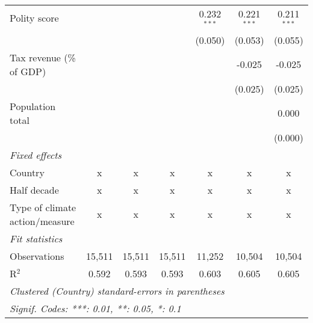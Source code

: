 \begin{tabular}{lcccccc}
   Polity score                                                         &         &                &                & 0.232$^{***}$  & 0.221$^{***}$  & 0.211$^{***}$\\   
                                                                        &         &                &                & (0.050)        & (0.053)        & (0.055)\\   
   Tax revenue (\% of GDP)                                              &         &                &                &                & -0.025         & -0.025\\   
                                                                        &         &                &                &                & (0.025)        & (0.025)\\   
   Population total                                                     &         &                &                &                &                & 0.000\\   
                                                                        &         &                &                &                &                & (0.000)\\   
   \emph{Fixed effects}\\
   Country                                                              & x       & x              & x              & x              & x              & x\\  
   Half decade                                                          & x       & x              & x              & x              & x              & x\\  
   Type of climate action/measure                                       & x       & x              & x              & x              & x              & x\\  
   \midrule \emph{Fit statistics}\\
   Observations                                                         & 15,511  & 15,511         & 15,511         & 11,252         & 10,504         & 10,504\\  
   R$^2$                                                                & 0.592   & 0.593          & 0.593          & 0.603          & 0.605          & 0.605\\  
   \midrule
   \multicolumn{7}{l}{\emph{Clustered (Country) standard-errors in parentheses}}\\
   \multicolumn{7}{l}{\emph{Signif. Codes: ***: 0.01, **: 0.05, *: 0.1}}\\
\end{tabular}
\par\endgroup


